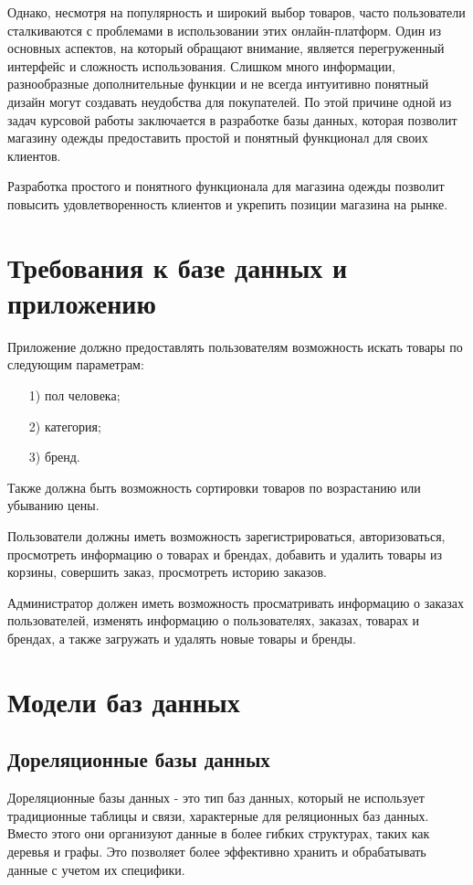 \documentclass{bmstu}
\begin{document}
Однако, несмотря на популярность и широкий выбор товаров, часто пользователи сталкиваются с проблемами в использовании этих онлайн-платформ. Один из основных аспектов, на который обращают внимание, является перегруженный интерфейс и сложность использования. Слишком много информации, разнообразные дополнительные функции и не всегда интуитивно понятный дизайн могут создавать неудобства для покупателей. По этой причине одной из задач курсовой работы заключается в разработке базы данных, которая позволит магазину одежды предоставить простой и понятный функционал для своих клиентов.

Разработка простого и понятного функционала для магазина одежды позволит повысить удовлетворенность клиентов и укрепить позиции магазина на рынке.

\section{Требования к базе данных и приложению}

Приложение должно предоставлять пользователям возможность искать товары по следующим параметрам:
\begin{enumerate}
	\item[1)] пол человека;
	\item[2)] категория;
	\item[3)] бренд.
\end{enumerate}

Также должна быть возможность сортировки товаров по возрастанию или убыванию цены.

Пользователи должны иметь возможность зарегистрироваться, авторизоваться, просмотреть информацию о товарах и брендах, добавить и удалить товары из корзины, совершить заказ, просмотреть историю заказов.

Администратор должен иметь возможность просматривать информацию о заказах пользователей, изменять информацию о пользователях, заказах, товарах и брендах, а также загружать и удалять новые товары и бренды.

\section{Модели баз данных}

\subsection{Дореляционные базы данных}

Дореляционные базы данных - это тип баз данных, который не использует традиционные таблицы и связи, характерные для реляционных баз данных. Вместо этого они организуют данные в более гибких структурах, таких как деревья и графы. Это позволяет более эффективно хранить и обрабатывать данные с учетом их специфики.
\end{document}
